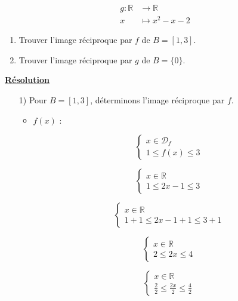 \documentclass[a4paper,12pt]{article}
\begin{document}
    \[
    \begin{aligned}
 g : \mathbb{R} &\to \mathbb{R} \\
        x &\mapsto x^2 - x - 2
    \end{aligned}
    \]

\begin{enumerate}
    \item Trouver l’image réciproque par \( f \) de \( B = [1,3] \).
    \item Trouver l’image réciproque par \( g \) de \( B = \{0\} \).
\end{enumerate}

\textbf{\underline{Résolution}}

\begin{enumerate}
    \item[1)] Pour \( B = [1,3] \), déterminons l’image réciproque par \( f \).

    \begin{itemize}
        \item \( f(x) \) :
        
        \[
        \left\{
        \begin{array}{l}
            x \in \mathcal{D}_f  \\
            1 \leq f(x) \leq 3
        \end{array}
        \right.
        \]

        \[
        \left\{
        \begin{array}{l}
            x \in \mathbb{R} \\
            1 \leq 2x - 1 \leq 3
        \end{array}
        \right.
        \]

        \[
        \left\{
        \begin{array}{l}
            x \in \mathbb{R} \\
            1 + 1 \leq 2x - 1 + 1 \leq 3 + 1
        \end{array}
        \right.
        \]

        \[
        \left\{
        \begin{array}{l}
            x \in \mathbb{R} \\
            2 \leq 2x \leq 4
        \end{array}
        \right.
        \]

        \[
        \left\{
        \begin{array}{l}
            x \in \mathbb{R} \\
            \frac{2}{2} \leq \frac{2x}{2} \leq \frac{4}{2}
        \end{array}
        \right.
        \]


\end{itemize}
\end{enumerate}
\end{document}
